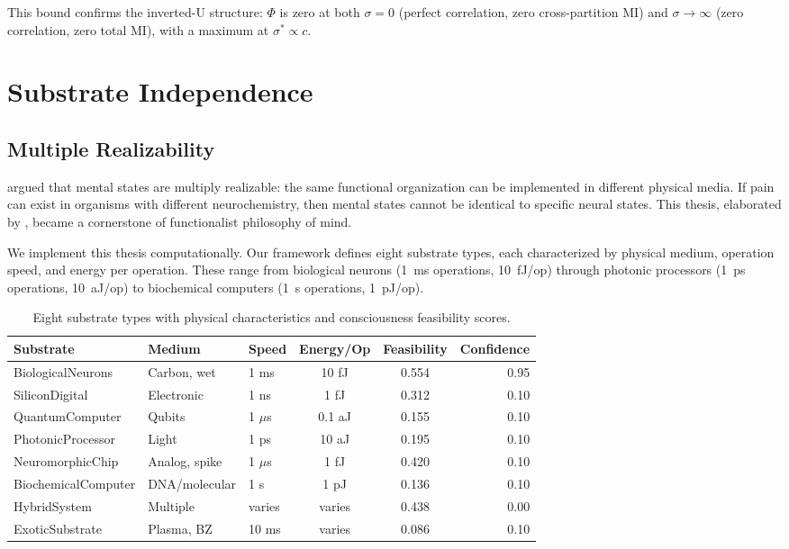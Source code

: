 \documentclass[12pt]{book}
\begin{document}
This bound confirms the inverted-U structure: $\Phi$ is zero at both $\sigma = 0$ (perfect correlation, zero cross-partition MI) and $\sigma \to \infty$ (zero correlation, zero total MI), with a maximum at $\sigma^* \propto c$.


\chapter{Substrate Independence}
\label{ch:substrate}

\section{Multiple Realizability}

\citet{putnam1967psychological} argued that mental states are multiply realizable: the same functional organization can be implemented in different physical media. If pain can exist in organisms with different neurochemistry, then mental states cannot be identical to specific neural states. This thesis, elaborated by \citet{fodor1974special}, became a cornerstone of functionalist philosophy of mind.

We implement this thesis computationally. Our framework defines eight substrate types, each characterized by physical medium, operation speed, and energy per operation. These range from biological neurons (1~ms operations, 10~fJ/op) through photonic processors (1~ps operations, 10~aJ/op) to biochemical computers (1~s operations, 1~pJ/op).

\begin{table}[H]
\centering
\caption{Eight substrate types with physical characteristics and consciousness feasibility scores.}
\label{tab:substrates}
\begin{tabular}{lllccr}
\toprule
\textbf{Substrate} & \textbf{Medium} & \textbf{Speed} & \textbf{Energy/Op} & \textbf{Feasibility} & \textbf{Confidence} \\
\midrule
BiologicalNeurons & Carbon, wet & 1 ms & 10 fJ & 0.554 & 0.95 \\
SiliconDigital & Electronic & 1 ns & 1 fJ & 0.312 & 0.10 \\
QuantumComputer & Qubits & 1 $\mu$s & 0.1 aJ & 0.155 & 0.10 \\
PhotonicProcessor & Light & 1 ps & 10 aJ & 0.195 & 0.10 \\
NeuromorphicChip & Analog, spike & 1 $\mu$s & 1 fJ & 0.420 & 0.10 \\
BiochemicalComputer & DNA/molecular & 1 s & 1 pJ & 0.136 & 0.10 \\
HybridSystem & Multiple & varies & varies & 0.438 & 0.00 \\
ExoticSubstrate & Plasma, BZ & 10 ms & varies & 0.086 & 0.10 \\
\bottomrule
\end{tabular}
\end{table}
\end{document}
